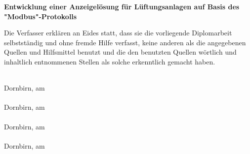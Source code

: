 
\vspace{30pt}

\begin{center}
    \textbf{\LARGE Entwicklung einer Anzeigelösung für Lüftungsanlagen auf Basis des "Modbus"-Protokolls}
\end{center}

\vspace{30pt}

\noindent Die Verfasser erklären an Eides statt, dass sie die vorliegende Diplomarbeit selbstständig und ohne fremde Hilfe verfasst, keine anderen als die angegebenen Quellen und Hilfsmittel benutzt und die den benutzten Quellen wörtlich und inhaltlich entnommenen Stellen als solche erkenntlich gemacht haben.

\vfill

\noindent
\begin{minipage}[t]{0.35\textwidth}
\centering
\underline{\hspace{5cm}} \\
\vspace{-0.4\baselineskip}
Dornbirn, am \\
\underline{\hspace{5cm}} \\
\vspace{-0.4\baselineskip}
Dornbirn, am \\
\underline{\hspace{5cm}} \\
\vspace{-0.4\baselineskip}
Dornbirn, am \\
\underline{\hspace{5cm}} \\
\vspace{-0.4\baselineskip}
Dornbirn, am \\
\end{minipage}
\hfill
\begin{minipage}[t]{0.55\textwidth}
\centering
\underline{\hspace{7cm}} \\
\vspace{-0.4\baselineskip}
\fenkart \\
\underline{\hspace{7cm}} \\
\vspace{-0.4\baselineskip}
\mangeng \\
\underline{\hspace{7cm}} \\
\vspace{-0.4\baselineskip}
\pezze \\
\underline{\hspace{7cm}} \\
\vspace{-0.4\baselineskip}
\schneider \\
\end{minipage}

